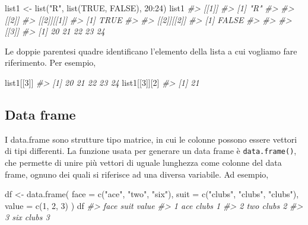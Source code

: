 \documentclass[
  11pt,
]{krantz}
\makeatletter
\newenvironment{Shaded}{\begin{snugshade}}{\end{snugshade}}
\newcommand{\AttributeTok}[1]{\textcolor[rgb]{0.61,0.61,0.61}{#1}}
\newcommand{\CommentTok}[1]{\textcolor[rgb]{0.37,0.37,0.37}{\textit{#1}}}
\newcommand{\ConstantTok}[1]{\textcolor[rgb]{0,0,0}{#1}}
\newcommand{\DecValTok}[1]{\textcolor[rgb]{0.06,0.06,0.06}{#1}}
\newcommand{\FunctionTok}[1]{\textcolor[rgb]{0,0,0}{#1}}
\newcommand{\NormalTok}[1]{#1}
\newcommand{\OtherTok}[1]{\textcolor[rgb]{0.37,0.37,0.37}{#1}}
\newcommand{\SpecialCharTok}[1]{\textcolor[rgb]{0,0,0}{#1}}
\newcommand{\StringTok}[1]{\textcolor[rgb]{0.5,0.5,0.5}{#1}}
\newenvironment{kframe}{%
\medskip{}
\setlength{\fboxsep}{.8em}
 \def\at@end@of@kframe{}%
 \ifinner\ifhmode%
  \def\at@end@of@kframe{\end{minipage}}%
  \begin{minipage}{\columnwidth}%
 \fi\fi%
 \def\FrameCommand##1{\hskip\@totalleftmargin \hskip-\fboxsep
 \colorbox{shadecolor}{##1}\hskip-\fboxsep
     \hskip-\linewidth \hskip-\@totalleftmargin \hskip\columnwidth}%
 \MakeFramed {\advance\hsize-\width
   \@totalleftmargin\z@ \linewidth\hsize
   \@setminipage}}%
 {\par\unskip\endMakeFramed%
 \at@end@of@kframe}
\renewenvironment{Shaded}{\begin{kframe}}{\end{kframe}}
\theoremstyle{definition}
\theoremstyle{definition}
\theoremstyle{definition}
\theoremstyle{definition}
\theoremstyle{remark}
\makeatother
\begin{document}
\begin{Shaded}
\begin{Highlighting}[]
\NormalTok{list1 }\OtherTok{\textless{}{-}} \FunctionTok{list}\NormalTok{(}\StringTok{"R"}\NormalTok{, }\FunctionTok{list}\NormalTok{(}\ConstantTok{TRUE}\NormalTok{, }\ConstantTok{FALSE}\NormalTok{), }\DecValTok{20}\SpecialCharTok{:}\DecValTok{24}\NormalTok{)}
\NormalTok{list1}
\CommentTok{\#\textgreater{} [[1]]}
\CommentTok{\#\textgreater{} [1] "R"}
\CommentTok{\#\textgreater{} }
\CommentTok{\#\textgreater{} [[2]]}
\CommentTok{\#\textgreater{} [[2]][[1]]}
\CommentTok{\#\textgreater{} [1] TRUE}
\CommentTok{\#\textgreater{} }
\CommentTok{\#\textgreater{} [[2]][[2]]}
\CommentTok{\#\textgreater{} [1] FALSE}
\CommentTok{\#\textgreater{} }
\CommentTok{\#\textgreater{} }
\CommentTok{\#\textgreater{} [[3]]}
\CommentTok{\#\textgreater{} [1] 20 21 22 23 24}
\end{Highlighting}
\end{Shaded}

Le doppie parentesi quadre identificano l'elemento della lista a cui vogliamo fare riferimento. Per esempio,

\begin{Shaded}
\begin{Highlighting}[]
\NormalTok{list1[[}\DecValTok{3}\NormalTok{]]}
\CommentTok{\#\textgreater{} [1] 20 21 22 23 24}
\NormalTok{list1[[}\DecValTok{3}\NormalTok{]][}\DecValTok{2}\NormalTok{]}
\CommentTok{\#\textgreater{} [1] 21}
\end{Highlighting}
\end{Shaded}

\hypertarget{data-frame}{%
\subsection{Data frame}\label{data-frame}}

I data.frame sono strutture tipo matrice, in cui le colonne possono essere vettori di tipi differenti. La funzione usata per generare un data frame è \texttt{data.frame()}, che permette di unire più vettori di uguale lunghezza come colonne del data frame, ognuno dei quali si riferisce ad una diversa variabile. Ad esempio,

\begin{Shaded}
\begin{Highlighting}[]
\NormalTok{df }\OtherTok{\textless{}{-}} \FunctionTok{data.frame}\NormalTok{(}
  \AttributeTok{face =} \FunctionTok{c}\NormalTok{(}\StringTok{"ace"}\NormalTok{, }\StringTok{"two"}\NormalTok{, }\StringTok{"six"}\NormalTok{),}
  \AttributeTok{suit =} \FunctionTok{c}\NormalTok{(}\StringTok{"clubs"}\NormalTok{, }\StringTok{"clubs"}\NormalTok{, }\StringTok{"clubs"}\NormalTok{), }
  \AttributeTok{value =} \FunctionTok{c}\NormalTok{(}\DecValTok{1}\NormalTok{, }\DecValTok{2}\NormalTok{, }\DecValTok{3}\NormalTok{)}
\NormalTok{)}
\NormalTok{df}
\CommentTok{\#\textgreater{}   face  suit value}
\CommentTok{\#\textgreater{} 1  ace clubs     1}
\CommentTok{\#\textgreater{} 2  two clubs     2}
\CommentTok{\#\textgreater{} 3  six clubs     3}
\end{Highlighting}
\end{Shaded}
\end{document}
